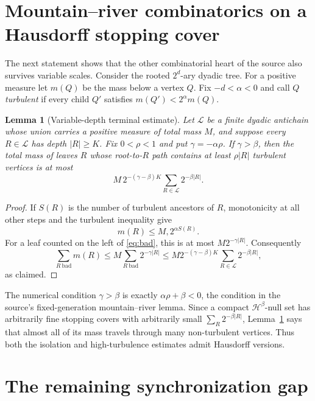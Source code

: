 \documentclass[11pt]{article}
\newtheorem{lemma}{Lemma}
\newcommand{\Hd}{\mathcal H}
\begin{document}
\section{Mountain--river combinatorics on a Hausdorff stopping cover}

The next statement shows that the other combinatorial heart of the source
also survives variable scales.  Consider the rooted $2^d$-ary dyadic tree.
For a positive measure let $m(Q)$ be the mass below a vertex $Q$.  Fix
$-d<\alpha<0$ and call $Q$ \emph{turbulent} if every child $Q'$ satisfies
$m(Q')<2^\alpha m(Q)$.

\begin{lemma}[Variable-depth terminal estimate]\label{lem:stopping}
Let $\mathcal L$ be a finite dyadic antichain whose union carries a positive
measure of total mass $M$, and suppose every $R\in\mathcal L$ has depth
$|R|\ge K$.  Fix $0<\rho<1$ and put $\gamma=-\alpha\rho$.  If
$\gamma>\beta$, then the total mass of leaves $R$ whose root-to-$R$ path
contains at least $\rho|R|$ turbulent vertices is at most
\begin{equation}\label{eq:bad}
 M\,2^{-(\gamma-\beta)K}
       \sum_{R\in\mathcal L}2^{-\beta|R|}.
\end{equation}
\end{lemma}

\begin{proof}
If $S(R)$ is the number of turbulent ancestors of $R$, monotonicity at all
other steps and the turbulent inequality give
\[
                    m(R)\le M,2^{\alpha S(R)}.
\]
For a leaf counted on the left of \eqref{eq:bad}, this is at most
$M2^{-\gamma|R|}$.  Consequently
\[
 \sum_{R\ \mathrm{bad}}m(R)
 \le M\sum_{R\ \mathrm{bad}}2^{-\gamma|R|}
 \le M2^{-(\gamma-\beta)K}
            \sum_{R\in\mathcal L}2^{-\beta|R|},
\]
as claimed.
\end{proof}

The numerical condition $\gamma>\beta$ is exactly
$\alpha\rho+\beta<0$, the condition in the source's fixed-generation
mountain--river lemma.  Since a compact $\Hd^\beta$-null set has arbitrarily
fine stopping covers with arbitrarily small
$\sum_R2^{-\beta|R|}$, Lemma~\ref{lem:stopping} says that almost all of its
mass travels through many non-turbulent vertices.  Thus both the isolation
and high-turbulence estimates admit Hausdorff versions.

\section{The remaining synchronization gap}
\end{document}

